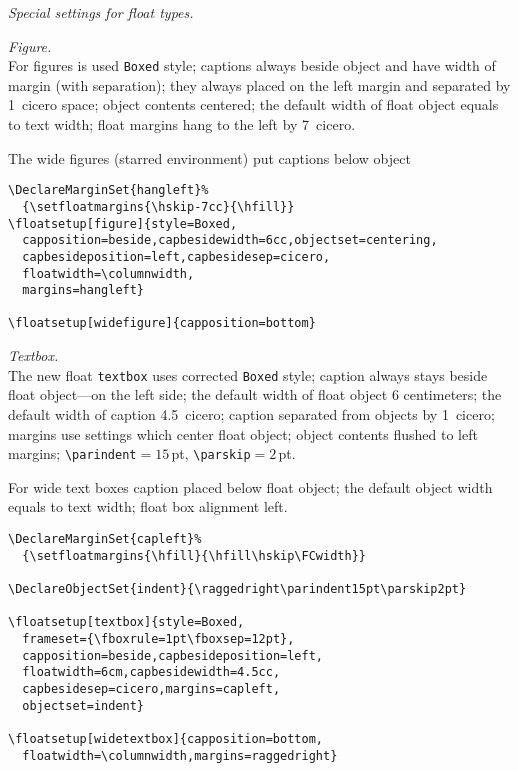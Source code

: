 \documentclass{book}
\providecommand*{\env}[1]{\texttt{#1}}
\begin{document}
\begin{sl}
\emph{Special settings for float types.}

\emph{Figure.}\\
For figures is used \texttt{Boxed} style;
captions always beside object and have width of margin (with separation);
they always placed on the left margin and separated by 1~cicero space;
object contents centered;
the default width of float object equals to text width;
float margins hang to the left by 7~cicero.

The wide figures (starred environment) put captions below object
\begin{verbatim}
\DeclareMarginSet{hangleft}%
  {\setfloatmargins{\hskip-7cc}{\hfill}}
\floatsetup[figure]{style=Boxed,
  capposition=beside,capbesidewidth=6cc,objectset=centering,
  capbesideposition=left,capbesidesep=cicero,
  floatwidth=\columnwidth,
  margins=hangleft}

\floatsetup[widefigure]{capposition=bottom}
\end{verbatim}

\emph{Textbox.}\\
The new float \env{textbox} uses corrected \texttt{Boxed} style;
caption always stays beside float object---on the left side;
the default width of float object 6 centimeters;
the default width of caption 4.5~cicero;
caption separated from objects by 1~cicero;
margins use settings which center float object;
object contents flushed to left margins;
\verb|\parindent|${{}=15}$\,pt, \verb|\parskip|${{}=2}$\,pt.

For wide text boxes caption placed below float object;
the default object width equals to text width;
float box alignment left.
\begin{verbatim}
\DeclareMarginSet{capleft}%
  {\setfloatmargins{\hfill}{\hfill\hskip\FCwidth}}

\DeclareObjectSet{indent}{\raggedright\parindent15pt\parskip2pt}

\floatsetup[textbox]{style=Boxed,
  frameset={\fboxrule=1pt\fboxsep=12pt},
  capposition=beside,capbesideposition=left,
  floatwidth=6cm,capbesidewidth=4.5cc,
  capbesidesep=cicero,margins=capleft,
  objectset=indent}

\floatsetup[widetextbox]{capposition=bottom,
  floatwidth=\columnwidth,margins=raggedright}
\end{verbatim}

\end{sl}


\def\text{{\mdseries
And more text and some more text and a bit more text and
a little more text and a little peace of text to fill space}}
\end{document}
